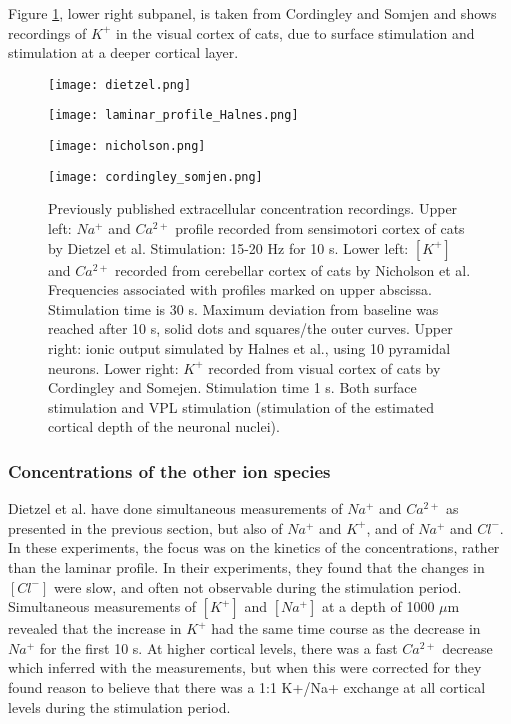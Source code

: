 \documentclass{article}
\begin{document}
Figure \ref{fig:data sets}, lower right subpanel, is taken from Cordingley and Somjen \cite{CordingleySomjen} and shows recordings of $K^+$ in the visual cortex of cats, due to surface stimulation and stimulation at a deeper cortical layer. 
\begin{figure}[!tbp]
  \centering
  \begin{minipage}[b]{0.45\textwidth}
    \texttt{[image: dietzel.png]}
  \end{minipage}
  \hfill
  \begin{minipage}[b]{0.5\textwidth}
    \texttt{[image: laminar\_profile\_Halnes.png]}
  \end{minipage}
    \begin{minipage}[b]{0.45\textwidth}
    \texttt{[image: nicholson.png]}
  \end{minipage}
  \hfill
  \begin{minipage}[b]{0.5\textwidth}
    \texttt{[image: cordingley\_somjen.png]}
  \end{minipage}
  \caption{Previously published extracellular concentration recordings. Upper left: $Na^+$ and $Ca^{2+}$ profile recorded from sensimotori cortex of cats by Dietzel et al. Stimulation: 15-20 Hz for 10 s. Lower left: $[K^+]$ and $Ca^{2+}$  recorded from cerebellar cortex of cats by Nicholson et al. Frequencies associated with profiles marked on upper abscissa. Stimulation time is 30 s. Maximum deviation from baseline was reached after 10 s, solid dots and squares/the outer curves. Upper right: ionic output simulated by Halnes et al., using 10 pyramidal neurons. Lower right: $K^+$ recorded from visual cortex of cats by Cordingley and Somejen. Stimulation time 1 s. Both surface stimulation and VPL stimulation (stimulation of the estimated cortical depth of the neuronal nuclei).
}
  \label{fig:data sets}
\end{figure} 



\subsubsection{Concentrations of the other ion species}
 Dietzel et al. \cite{Dietzel1982} have done simultaneous measurements of $Na^+$ and $Ca^{2+}$ as presented in the previous section, but also of $Na^+$ and $K^{+}$, and of $Na^+$ and $Cl^{-}$. In these experiments, the focus was on the kinetics of the concentrations, rather than the laminar profile. In their experiments, they found that the changes in $[Cl^-]$ were slow, and often not observable during the stimulation period. Simultaneous measurements of $[K^+]$ and $[Na^+]$ at a depth of 1000 $\mu$m revealed that the increase in $K^+$ had the same time course as the decrease in $Na^+$ for the first 10 s. At higher cortical levels, there was a fast $Ca^{2+}$ decrease which inferred with the measurements, but when this were corrected for they found reason to believe that there was a 1:1 K+/Na+ exchange at all cortical levels during the stimulation period. 
 
\end{document}
